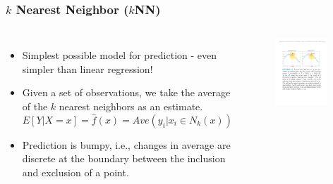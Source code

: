 \documentclass{beamer}
\begin{document}
\begin{frame}
\frametitle{$k$ Nearest Neighbor ($k$NN)}
\begin{columns}
    \begin{itemize}
        \item Simplest possible model for prediction - even simpler than linear regression!
        \item Given a set of observations, we take the average of the $k$ nearest neighbors as an estimate.
        \begin{equation*}
            E[Y|X=x] = \hat{f}(x) = Ave(y_i|x_i \in N_k(x))
        \end{equation*}
        \item Prediction is bumpy, i.e., changes in average are discrete at the boundary between the inclusion and exclusion of a point.
    \end{itemize}
\begin{figure}
            \centering
            \includegraphics[width=0.9\textwidth]{figures/knn.pdf}
        \end{figure}
\end{columns}
\end{frame}
\end{document}
